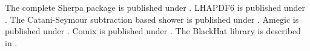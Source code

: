 \documentclass{article}
\begin{document}
The complete Sherpa package is published under \cite{Gleisberg:2008ta}.
LHAPDF6 is published under \cite{Buckley:2014ana}.
The Catani-Seymour subtraction based shower is published under \cite{Schumann:2007mg}.
Amegic is published under \cite{Krauss:2001iv}.
Comix is published under \cite{Gleisberg:2008fv}.
The BlackHat library is described in \cite{Berger:2008sj}.
\end{document}
